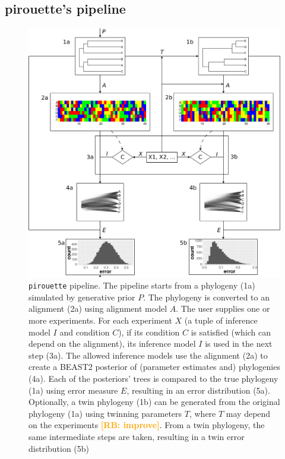 \documentclass{article}
\newcommand{\richel}[1]{\textcolor{orange}{\textbf{[RB: #1]}}}
\begin{document}
\subsection{pirouette's pipeline}

\begin{figure}
  \centering
  \includegraphics[width=\textwidth]{workflow.png}
  \caption{
    \texttt{pirouette} pipeline. 
    The pipeline starts from a phylogeny (1a) simulated by generative prior 
$\mathit{P}$.
    The phylogeny is converted to an alignment (2a) using alignment model 
$\mathit{A}$. 
    The user supplies one or more experiments.
    For each experiment $\mathit{X}$ 
    (a tuple of inference model $\mathit{I}$ and condition $\mathit{C}$),
    if its condition $\mathit{C}$ is 
    satisfied (which can depend on the alignment), 
    its inference model $\mathit{I}$ is used in the next step (3a).
    The allowed inference models use the alignment (2a) 
    to create a BEAST2 posterior of (parameter estimates and) phylogenies (4a). 
    Each of the posteriors' trees is compared to the true phylogeny (1a) 
    using error measure $\mathit{E}$, 
    resulting in an error distribution (5a). 
    Optionally, a twin phylogeny (1b) can be generated from the original 
    phylogeny (1a) using twinning parameters $T$, where $T$ may depend on
    the experiments \richel{improve}.
    From a twin phylogeny, the same intermediate steps are taken,
    resulting in a twin error distribution (5b)
  }
  \label{fig:pipeline}
\end{figure}
\end{document}
